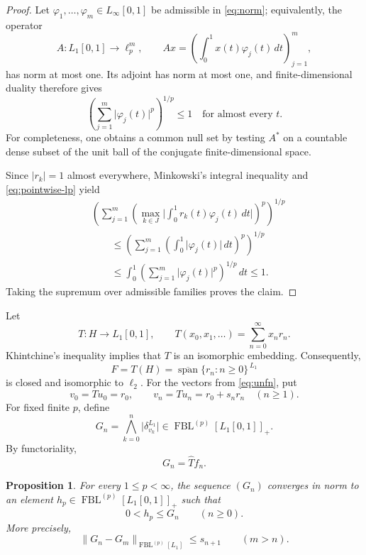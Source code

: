 \documentclass[11pt]{article}
\newtheorem{proposition}[theorem]{Proposition}
\theoremstyle{remark}
\newcommand{\FBL}[2]{\operatorname{FBL}^{(#1)}[#2]}
\newcommand{\wh}[1]{\widehat{#1}}
\newcommand{\abs}[1]{\lvert #1\rvert}
\newcommand{\norm}[1]{\lVert #1\rVert}
\begin{document}
\begin{proof}
Let \(\varphi_1,\ldots,\varphi_m\in L_\infty[0,1]\) be admissible in
\eqref{eq:norm}; equivalently, the operator
\[
  A:L_1[0,1]\longrightarrow\ell_p^m,
  \qquad
  Ax=\left(\int_0^1x(t)\varphi_j(t)\,dt\right)_{j=1}^m,
\]
has norm at most one.  Its adjoint has norm at most one, and finite-dimensional
duality therefore gives
\begin{equation}\label{eq:pointwise-lp}
  \left(\sum_{j=1}^m\abs{\varphi_j(t)}^p\right)^{1/p}\le1
  \quad\text{for almost every }t.
\end{equation}
For completeness, one obtains a common null set by testing \(A^*\) on a
countable dense subset of the unit ball of the conjugate finite-dimensional
space.

Since \(\abs{r_k}=1\) almost everywhere, Minkowski's integral inequality and
\eqref{eq:pointwise-lp} yield
\[
 \begin{aligned}
  &\left(
    \sum_{j=1}^m
    \left(\max_{k\in J}\abs{\int_0^1 r_k(t)\varphi_j(t)\,dt}\right)^p
  \right)^{1/p}\\
  &\qquad\le
  \left(\sum_{j=1}^m\left(\int_0^1\abs{\varphi_j(t)}\,dt\right)^p\right)^{1/p}\\
  &\qquad\le
  \int_0^1
  \left(\sum_{j=1}^m\abs{\varphi_j(t)}^p\right)^{1/p}\,dt
  \le1.
 \end{aligned}
\]
Taking the supremum over admissible families proves the claim.
\end{proof}

Let
\[
  T:H\longrightarrow L_1[0,1],
  \qquad
  T(x_0,x_1,\ldots)=\sum_{n=0}^\infty x_nr_n.
\]
Khintchine's inequality implies that \(T\) is an isomorphic embedding.
Consequently,
\[
  F=T(H)=\overline{\operatorname{span}}\{r_n:n\ge0\}^{\,L_1}
\]
is closed and isomorphic to \(\ell_2\).  For the vectors from
\eqref{eq:unfn}, put
\[
  v_0=Tu_0=r_0,
  \qquad
  v_n=Tu_n=r_0+s_nr_n \quad(n\ge1).
\]
For fixed finite \(p\), define
\begin{equation}\label{eq:Gn}
  G_n=\bigwedge_{k=0}^n\abs{\delta_{v_k}^{L_1}}
  \in\FBL{p}{L_1[0,1]}_+.
\end{equation}
By functoriality,
\begin{equation}\label{eq:imagefn}
  G_n=\wh T f_n.
\end{equation}

\begin{proposition}\label{prop:ambient-limit}
For every \(1\le p<\infty\), the sequence \((G_n)\) converges in norm to
an element \(h_p\in\FBL{p}{L_1[0,1]}_+\) such that
\[
  0<h_p\le G_n\qquad(n\ge0).
\]
More precisely,
\[
  \norm{G_n-G_m}_{\FBL{p}{L_1}}\le s_{n+1}
  \qquad(m>n).
\]
\end{proposition}
\end{document}
